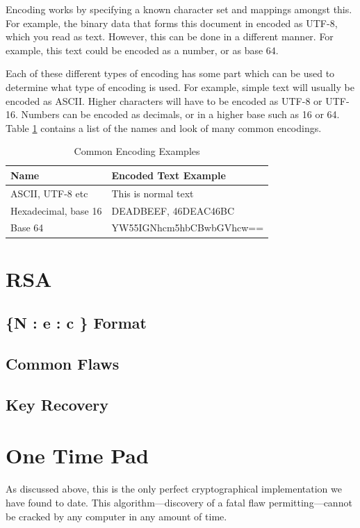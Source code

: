 				Encoding works by specifying a known character set and mappings amongst this. 
				For example, the binary data that forms this document in encoded as UTF-8, which you read as text. 
				However, this can be done in a different manner. 
				For example, this text could be encoded as a number, or as base 64. 

				Each of these different types of encoding has some part which can be used to determine what type of encoding is used. 
				For example, simple text will usually be encoded as ASCII. 
				Higher characters will have to be encoded as UTF-8 or UTF-16. 
				Numbers can be encoded as decimals, or in a higher base such as 16 or 64. 
				Table \ref{tab:Encodings} contains a list of the names and look of many common encodings. 
				\begin{table}[htb]
					\centering
				\begin{adjustbox}{max width=1\textwidth}
					\begin{tabular}{| l | l |}
						\hline
						\textbf{Name} & \textbf{Encoded Text Example} \\ \hline
						ASCII, UTF-8 etc & This is normal text \\ \hline
						Hexadecimal, base 16 & DEADBEEF, 46DEAC46BC \\ \hline
						Base 64 & YW55IGNhcm5hbCBwbGVhcw== \\ \hline
					\end{tabular}
				\end{adjustbox}
					\caption{Common Encoding Examples}
					\label{tab:Encodings}
				\end{table}
	\section{RSA}
		
		\subsection{\{N : e : c \} Format}
		\subsection{Common Flaws}
		\subsection{Key Recovery}
	\section{One Time Pad}
		As discussed above, this is the only perfect cryptographical implementation we have found to date. 
		This algorithm---discovery of a fatal flaw permitting---cannot be cracked by any computer in any amount of time. 

